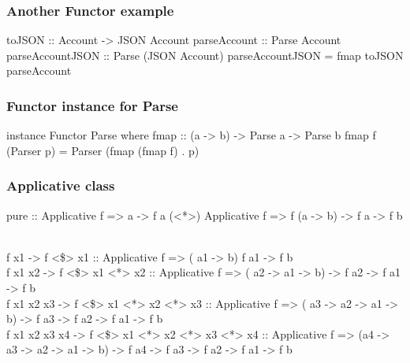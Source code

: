 \documentclass{beamer}
\begin{document}
%
%


\begin{frame}
\frametitle{Another Functor example}
 toJSON :: Account -> JSON Account
%
 parseAccount :: Parse Account
%
 parseAccountJSON :: Parse (JSON Account)
 parseAccountJSON = fmap toJSON parseAccount
%
\end{frame}


\begin{frame}
\frametitle{Functor instance for Parse}
instance Functor Parse where
  fmap :: (a -> b) -> Parse a -> Parse b
  fmap f (Parser p) = Parser (fmap (fmap f) . p)
%
\end{frame}




\begin{frame}
\frametitle{Applicative class}
pure :: Applicative f => a -> f a
(<*>) Applicative f => f (a -> b) -> f a -> f b

\\f x1          -> f <\$> x1                      :: Applicative f => (                  a1 -> b)                            f a1 -> f b
\\f x1 x2       -> f <\$> x1 <*> x2               :: Applicative f => (            a2 -> a1 -> b)                 -> f a2 -> f a1 -> f b
\\f x1 x2 x3    -> f <\$> x1 <*> x2 <*> x3        :: Applicative f => (      a3 -> a2 -> a1 -> b)         -> f a3 -> f a2 -> f a1 -> f b
\\f x1 x2 x3 x4 -> f <\$> x1 <*> x2 <*> x3 <*> x4 :: Applicative f => (a4 -> a3 -> a2 -> a1 -> b) -> f a4 -> f a3 -> f a2 -> f a1 -> f b

\end{frame}
\end{document}
